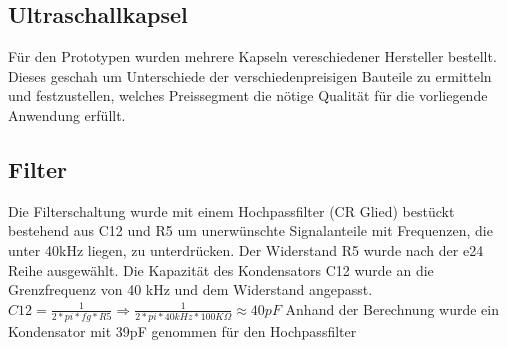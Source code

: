 \subsection{Ultraschallkapsel}%
Für den Prototypen wurden mehrere Kapseln vereschiedener Hersteller bestellt. Dieses geschah um Unterschiede der verschiedenpreisigen Bauteile zu ermitteln und festzustellen, welches Preissegment die nötige Qualität für die vorliegende Anwendung erfüllt.


\subsection{Filter}%
Die Filterschaltung wurde mit einem Hochpassfilter (CR Glied) bestückt bestehend aus C12 und R5 um unerwünschte Signalanteile mit Frequenzen, die unter 40kHz liegen, zu unterdrücken. Der Widerstand R5 wurde nach der e24 Reihe ausgewählt.
Die Kapazität des Kondensators C12 wurde an die Grenzfrequenz von 40 kHz und dem Widerstand angepasst.
\onehalfspacing \\
\(\displaystyle C12=\frac{1}{2*pi*fg*R5}\Rightarrow\frac{1}{2*pi*40kHz*100 K\Omega}\approx40pF \)
\singlespacing
Anhand der Berechnung wurde ein Kondensator mit 39pF genommen für den Hochpassfilter

